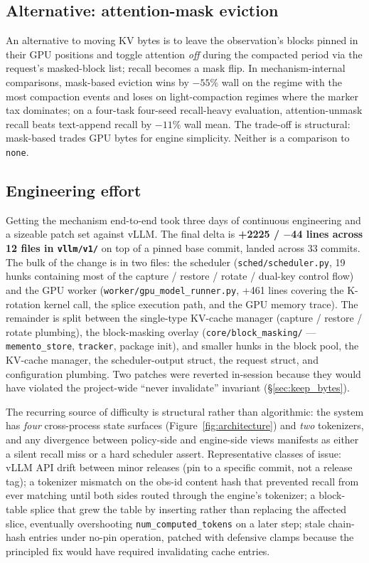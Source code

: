 \documentclass[letterpaper,twocolumn,10pt]{article}
\begin{document}
\subsection{Alternative: attention-mask eviction}

An alternative to moving KV bytes is to leave the observation's
blocks pinned in their GPU positions and toggle attention
\emph{off} during the compacted period via the request's
masked-block list; recall becomes a mask flip. In
mechanism-internal comparisons, mask-based eviction wins by
$-55\%$ wall on the regime with the most compaction events and
loses on light-compaction regimes where the marker tax dominates;
on a four-task four-seed recall-heavy evaluation, attention-unmask
recall beats text-append recall by $-11\%$ wall mean. The
trade-off is structural: mask-based trades GPU bytes for engine
simplicity. Neither is a comparison to \texttt{none}.

\subsection{Engineering effort}

Getting the mechanism end-to-end took three days of continuous
engineering and a sizeable patch set against vLLM. The final
delta is \textbf{+2225 / $-$44 lines across 12 files in
\texttt{vllm/v1/}} on top of a pinned base commit, landed across
33 commits. The bulk of the change is in two files: the
scheduler (\texttt{sched/scheduler.py}, 19 hunks containing most
of the capture / restore / rotate / dual-key control flow) and
the GPU worker (\texttt{worker/gpu\_model\_runner.py}, +461 lines
covering the K-rotation kernel call, the splice execution path,
and the GPU memory trace). The remainder is split between the
single-type KV-cache manager (capture / restore / rotate
plumbing), the block-masking overlay
(\texttt{core/block\_masking/} — \texttt{memento\_store},
\texttt{tracker}, package init), and smaller hunks in the block
pool, the KV-cache manager, the scheduler-output struct, the
request struct, and configuration plumbing. Two patches were
reverted in-session because they would have violated the
project-wide ``never invalidate'' invariant
(\S\ref{sec:keep_bytes}).

The recurring source of difficulty is structural rather than
algorithmic: the system has \emph{four} cross-process state
surfaces (Figure~\ref{fig:architecture}) and \emph{two}
tokenizers, and any divergence between policy-side and
engine-side views manifests as either a silent recall miss or a
hard scheduler assert. Representative classes of issue: vLLM API
drift between minor releases (pin to a specific commit, not a
release tag); a tokenizer mismatch on the obs-id content hash
that prevented recall from ever matching until both sides routed
through the engine's tokenizer; a block-table splice that grew
the table by inserting rather than replacing the affected slice,
eventually overshooting \texttt{num\_computed\_tokens} on a
later step; stale chain-hash entries under no-pin operation,
patched with defensive clamps because the principled fix would
have required invalidating cache entries.
\end{document}
